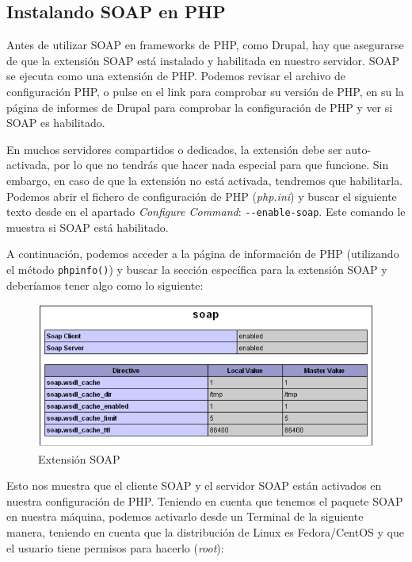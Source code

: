 \subsection{Instalando SOAP en PHP}

Antes de utilizar SOAP en frameworks de PHP, como Drupal, hay que asegurarse de que la extensión SOAP 
está instalado y habilitada en nuestro servidor. SOAP se ejecuta como una extensión de PHP. Podemos revisar 
el archivo de configuración PHP, o pulse en el link para comprobar su versión de PHP, en su la página de 
informes de Drupal para comprobar la configuración de PHP y ver si SOAP es habilitado. 

En muchos servidores compartidos o dedicados, la extensión debe ser auto-activada, por lo que no tendrás que 
hacer nada especial para que funcione. Sin embargo, en caso de que la extensión no está activada, tendremos que habilitarla.
Podemos abrir el fichero de configuración de PHP (\textit{php.ini}) y buscar el siguiente texto desde en el apartado 
\textit{Configure Command}: \verb|--enable-soap|. Este comando le muestra si SOAP está habilitado. 

A continuación, podemos acceder a la página de información de PHP (utilizando el método \verb|phpinfo()|) y 
buscar la sección específica para la extensión SOAP y deberíamos tener algo como lo siguiente:

\begin{figure}
  \centering
    \includegraphics[width=1\textwidth]{Assets/Soap/Imagenes/phpinfo.png}
  \caption{Extensión SOAP}
\end{figure}

Esto nos muestra que el cliente SOAP y el servidor SOAP están activados en nuestra configuración de PHP. 
Teniendo en cuenta que tenemos el paquete SOAP en nuestra máquina, podemos activarlo desde un Terminal 
de la siguiente manera, teniendo en cuenta que la distribución de Linux es Fedora/CentOS y que el usuario tiene 
permisos para hacerlo (\textit{root}):

